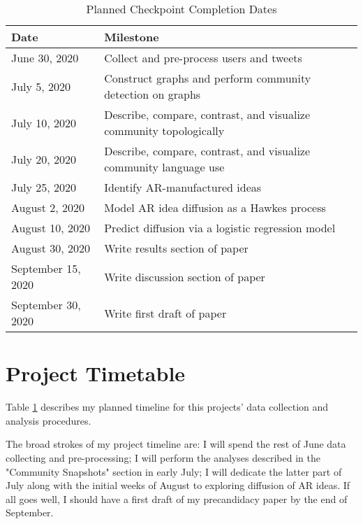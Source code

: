 \documentclass[acmlarge, screen, authorversion]{acmart}
\begin{document}
\begin{table}[htbp!]

	\caption{Planned Checkpoint Completion Dates}
	\label{table:timetable}

	\begin{tabular}{ l l  }

		\toprule
		Date               & Milestone                                                          \\
		\midrule
		June 30, 2020      & Collect and pre-process users and tweets                           \\
		\hline
		July 5, 2020       & Construct graphs and perform community detection on graphs         \\
		\hline
		July 10, 2020      & Describe, compare, contrast, and visualize community topologically \\
		\hline
		July 20, 2020      & Describe, compare, contrast, and visualize community language use  \\
		\hline
		July 25, 2020      & Identify AR-manufactured ideas                                     \\
		\hline
		August 2, 2020     & Model AR idea diffusion as a Hawkes process                        \\
		\hline
		August 10, 2020    & Predict diffusion via a logistic regression model                  \\
		\hline
		August 30, 2020    & Write results section of paper                                     \\
		\hline
		September 15, 2020    & Write discussion section of paper                                  \\
		\hline
		September 30, 2020 & Write first draft of paper                                         \\
		\bottomrule
	\end{tabular}
\end{table}

\section{Project Timetable}

Table \ref{table:timetable} describes my planned timeline for this projects' data collection and analysis procedures.

The broad strokes of my project timeline are: I will spend the rest of June data collecting and pre-processing; I will perform the analyses described in the "Community Snapshots" section in early July; I will dedicate the latter part of July along with the initial weeks of August to exploring diffusion of AR ideas. If all goes well, I should have a first draft of my precandidacy paper by the end of September.

\clearpage


\end{document}
